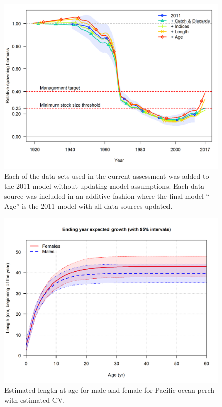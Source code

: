 \documentclass[12pt,]{article}
\begin{document}
\begin{figure}
\centering
\includegraphics{Figures/Data_Bratio_uncertainty.png}
\caption{Each of the data sets used in the current assessment was added
to the 2011 model without updating model assumptions. Each data source
was included in an additive fashion where the final model ``+ Age'' is
the 2011 model with all data sources updated. \label{fig:data_update}}
\end{figure}

\FloatBarrier

\begin{figure}
\centering
\includegraphics{r4ss/plots_mod1/bio1_sizeatage.png}
\caption{Estimated length-at-age for male and female for Pacific ocean
perch with estimated CV. \label{fig:sizeatage}}
\end{figure}
\end{document}
